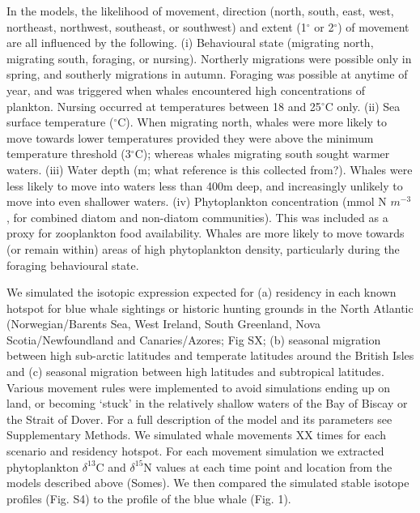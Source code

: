 \documentclass[a4paper,12pt]{article}
\begin{document}
In the models, the likelihood of movement, direction (north, south, east, west, northeast, northwest, southeast, or southwest) and extent (1$^{\circ}$ or 2$^{\circ}$) of movement are all influenced by the following. 
(i) Behavioural state (migrating north, migrating south, foraging, or nursing). 
Northerly migrations were possible only in spring, and southerly migrations in autumn. Foraging was possible at anytime of year, and was triggered when whales encountered high concentrations of plankton. Nursing occurred at temperatures between 18 and 25$^{\circ}$C only. 
(ii) Sea surface temperature ($^{\circ}$C\cite{yool2013medusa}). 
When migrating north, whales were more likely to move towards lower temperatures provided they were above the minimum temperature threshold (3$^{\circ}$C); whereas whales migrating south sought warmer waters. 
(iii) Water depth (m; what reference is this collected from?). 
Whales were less likely to move into waters less than 400m deep, and increasingly unlikely to move into even shallower waters. 
(iv) Phytoplankton concentration (mmol N $m^{-3}$, for combined diatom and non-diatom communities\cite{yool2013medusa}). 
This was included as a proxy for zooplankton food availability. 
Whales are more likely to move towards (or remain within) areas of high phytoplankton density, particularly during the foraging behavioural state. 
 
We simulated the isotopic expression expected for (a) residency in each known hotspot for blue whale sightings or historic hunting grounds in the North Atlantic (Norwegian/Barents Sea, West Ireland, South Greenland, Nova Scotia/Newfoundland and Canaries/Azores\cite{mcdonald2006biogeographic,reilly2008balaenoptera,sigurjonsson1995life}; Fig SX; (b) seasonal migration between high sub-arctic latitudes and temperate latitudes around the British Isles and (c) seasonal migration between high latitudes and subtropical latitudes. 
Various movement rules were implemented to avoid simulations ending up on land, or becoming `stuck' in the relatively shallow waters of the Bay of Biscay or the Strait of Dover. 
For a full description of the model and its parameters see Supplementary Methods. 
We simulated whale movements XX times for each scenario and residency hotspot. 
For each movement simulation we extracted phytoplankton $\delta^{13}$C and $\delta^{15}$N values at each time point and location from the models described above\cite{magozzi2017using} (Somes). 
We then compared the simulated stable isotope profiles (Fig. S4) to the profile of the blue whale (Fig. 1).
 
\end{document}
